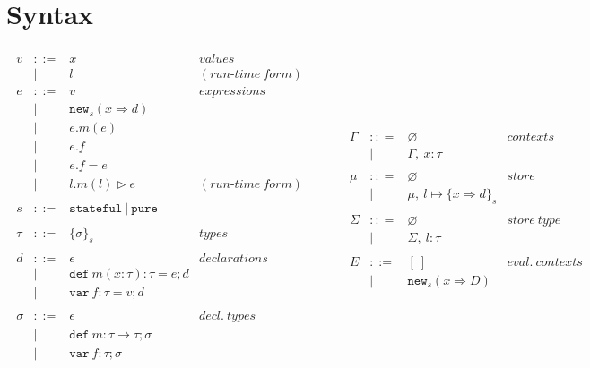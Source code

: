 \documentclass{llncs}
\newcommand{\keywadj}[1]{\mathtt{#1}}
\newcommand{\keyw}[1]{\keywadj{#1}~}
\begin{document}
\section{Syntax}

\[
\begin{array}{lll}
\begin{array}{lllr}
v & ::= & x & values \\
   & | & l & (run\mbox{-}time~form)\\
e & ::= & v & expressions \\
& | & \keywadj{new}_{s}(x \Rightarrow d) \\
& | & e.m(e)\\
& | & e.f \\
& | & e.f = e \\
& | & l.m(l) \rhd e & (run\mbox{-}time~form)\\
&&\\
s & ::= & \keyw{stateful} | ~\keyw{pure} \\
&&\\
\tau & ::= & \{ \sigma \}_{s} & types \\
&&\\
d & ::= & \epsilon & declarations \\
  & |   & \keyw{def} m(x:\tau):\tau = e; d \\
  & |   & \keyw{var} f:\tau = v; d \\
&&\\
\sigma & ::= & \epsilon & decl.~ types \\
       & |   & \keyw{def} m:\tau \rightarrow \tau; \sigma \\
       & |   & \keyw{var} f:\tau; \sigma \\
&&\\
\end{array}
& ~~~~~~
&
\begin{array}{lllr}
\Gamma & :: = & \varnothing & contexts\\
& | & \Gamma,~x : \tau\\
&&\\
\mu & :: = & \varnothing & store\\
& | & \mu,~l \mapsto \{ x \Rightarrow d \}_{s}\\
&&\\
\Sigma & :: = & \varnothing & store~type\\
& | & \Sigma,~l : \tau\\
&&\\
E & ::= & [~] & eval.~ contexts\\
  & |   & \keywadj{new}_{s}(x \Rightarrow D) \\

\end{array}
\end{array}\]
\end{document}
